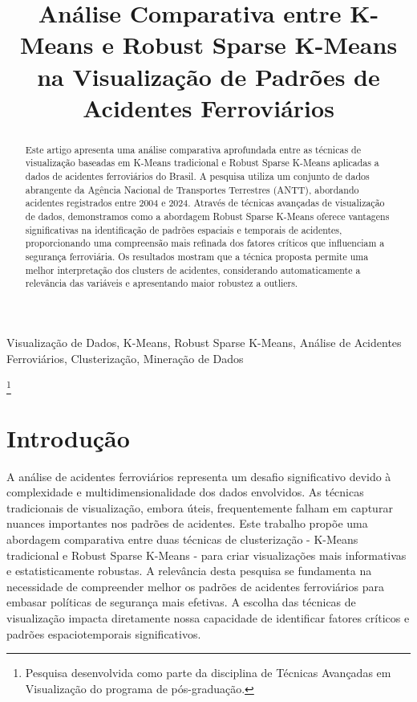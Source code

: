 \documentclass[conference]{IEEEtran}
\title{Análise Comparativa entre K-Means e Robust Sparse K-Means na Visualização de Padrões de Acidentes Ferroviários}
\author{
    \IEEEauthorblockN{Seu Nome}
    \IEEEauthorblockA{
        Departamento de Computação\\
        Sua Universidade\\
        Sua Cidade, Brasil\\
        email@dominio.com
    }
}
\begin{document}
\maketitle

\begin{abstract}
Este artigo apresenta uma análise comparativa aprofundada entre as técnicas de visualização baseadas em K-Means tradicional e Robust Sparse K-Means aplicadas a
dados de acidentes ferroviários do Brasil. A pesquisa utiliza um conjunto de dados abrangente da Agência Nacional de Transportes Terrestres (ANTT), abordando acidentes
registrados entre 2004 e 2024. Através de técnicas avançadas de visualização de dados, demonstramos como a abordagem Robust Sparse K-Means oferece vantagens
significativas na identificação de padrões espaciais e temporais de acidentes, proporcionando uma compreensão mais refinada dos fatores críticos que influenciam
a segurança ferroviária. Os resultados mostram que a técnica proposta permite uma melhor interpretação dos clusters de acidentes, considerando automaticamente
a relevância das variáveis e apresentando maior robustez a outliers.

\end{abstract}

\begin{IEEEkeywords}
Visualização de Dados, K-Means, Robust Sparse K-Means, Análise de Acidentes Ferroviários, Clusterização, Mineração de Dados
\end{IEEEkeywords}

\footnote{Pesquisa desenvolvida como parte da disciplina de Técnicas Avançadas em Visualização do programa de pós-graduação.}

\section{Introdução}
A análise de acidentes ferroviários representa um desafio significativo devido à complexidade e multidimensionalidade dos dados envolvidos.
As técnicas tradicionais de visualização, embora úteis, frequentemente falham em capturar nuances importantes nos padrões de acidentes.
Este trabalho propõe uma abordagem comparativa entre duas técnicas de clusterização - K-Means tradicional e Robust Sparse K-Means - para criar
visualizações mais informativas e estatisticamente robustas. A relevância desta pesquisa se fundamenta na necessidade de compreender melhor os
padrões de acidentes ferroviários para embasar políticas de segurança mais efetivas. A escolha das técnicas de visualização impacta diretamente
nossa capacidade de identificar fatores críticos e padrões espaciotemporais significativos.
\end{document}
